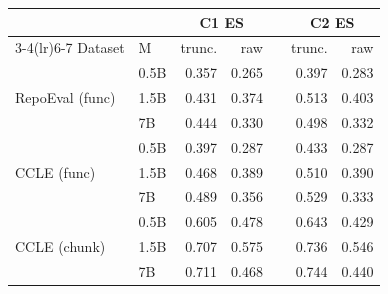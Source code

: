 \begin{tabular}{ll rr r rr}
\toprule
 & & \multicolumn{2}{c}{\textbf{C1 ES}} & & \multicolumn{2}{c}{\textbf{C2 ES}}\\
\cmidrule(lr){3-4}\cmidrule(lr){6-7}
Dataset & M & trunc. & raw & & trunc. & raw\\
\midrule
\multirow{3}{*}{RepoEval (func)} & 0.5B & 0.357 & 0.265 & & 0.397 & 0.283\\
 & 1.5B & 0.431 & 0.374 & & 0.513 & 0.403\\
 & 7B & 0.444 & 0.330 & & 0.498 & 0.332\\
\midrule
\multirow{3}{*}{CCLE (func)} & 0.5B & 0.397 & 0.287 & & 0.433 & 0.287\\
 & 1.5B & 0.468 & 0.389 & & 0.510 & 0.390\\
 & 7B & 0.489 & 0.356 & & 0.529 & 0.333\\
\midrule
\multirow{3}{*}{CCLE (chunk)} & 0.5B & 0.605 & 0.478 & & 0.643 & 0.429\\
 & 1.5B & 0.707 & 0.575 & & 0.736 & 0.546\\
 & 7B & 0.711 & 0.468 & & 0.744 & 0.440\\
\bottomrule
\end{tabular}